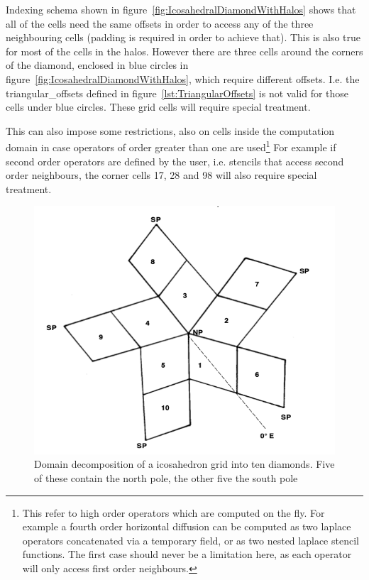 \documentclass{book}
\begin{document}
Indexing schema shown in figure~\ref{fig:IcosahedralDiamondWithHalos} shows that all of the cells need the same offsets in order to access any of the three neighbouring cells (padding is required in order to achieve that). This is also true for most of the cells in the halos. 
However there are three cells around the corners of the diamond, enclosed in blue circles in figure~\ref{fig:IcosahedralDiamondWithHalos}, 
which require different offsets. I.e. the triangular\_offsets defined in figure~\ref{lst:TriangularOffsets} is not valid for those cells under blue circles. These grid cells will require special treatment.
 
This can also impose some restrictions, also on cells inside the computation domain in case operators of order greater than one are used\footnote{This refer to high order operators which are computed on the fly. 
For example a fourth order horizontal diffusion can be computed as 
two laplace operators concatenated via a temporary field, or as two nested
laplace stencil functions. The first case should never be a limitation here, as
each operator will only access first order neighbours.}
For example if second order operators are defined by the user, i.e. stencils
that access second order neighbours, the corner cells 17, 28 and 98 will 
also require special treatment. 

\begin{figure}[htb!]
	\begin{center}
		\includegraphics[width=14cm]{fig/IcosahedralDecomposition.png}
		\caption{Domain decomposition of a icosahedron grid into ten diamonds.
			Five of these contain the north pole, the other five the south pole}
		\label{fig:IcosahedralDecomposition}
	\end{center}
\end{figure}
\end{document}
